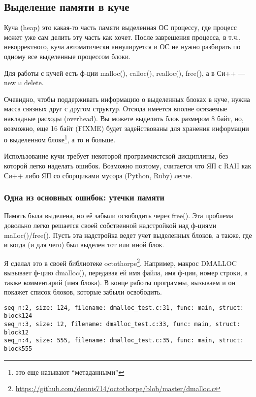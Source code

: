 ﻿\subsection{Выделение памяти в куче}

Куча (heap) это какая-то часть памяти выделенная ОС процессу, где процесс может уже сам делить эту часть как хочет.
После заврешения процесса, в т.ч., некорректного, куча автоматически аннулируется и ОС не нужно разбирать 
по одному все выделенные процессом блоки.

Для работы с кучей есть ф-ции malloc(), calloc(), realloc(), free(), а в Си++ --- new и delete.

Очевидно, чтобы поддерживать информацию о выделенных блоках в куче, нужна масса связных друг с другом структур.
Отсюда имеется вполне осязаемые накладные расходы (overhead). Вы можете выделить блок размером 8 байт, но, возможно, 
еще 16 байт (FIXME)
будет задействованы для хранения информации о выделенном блоке\footnote{это еще называют ``метаданными''}, 
а то и больше.

Использование кучи требует некоторой программистской дисциплины, без которой легко наделать ошибок.
Возможно поэтому, считается что ЯП с RAII как Си++
либо ЯП со сборщиками мусора (Python, Ruby) легче.

\subsubsection{Одна из основных ошибок: утечки памяти}

Память была выделена, но её забыли освободить через free(). Эта проблема довольно легко решается своей собственной
надстройкой над ф-циями malloc()/free(). Пусть эта надстройка ведет учет выделенных блоков, а также, где и когда
(и для чего) был выделен тот или иной блок.

Я сделал это в своей библиотеке octothorpe\footnote{\url{https://github.com/dennis714/octothorpe/blob/master/dmalloc.c}}. 
Например, макрос DMALLOC вызывает ф-цию dmalloc(), передавая
ей имя файла, имя ф-ции, номер строки, а также комментарий (имя блока). В конце работы программы, вызываем
 и он покажет список блоков, которые забыли освободить.

\begin{lstlisting}
seq_n:2, size: 124, filename: dmalloc_test.c:31, func: main, struct: block124
seq_n:3, size: 12, filename: dmalloc_test.c:33, func: main, struct: block12
seq_n:4, size: 555, filename: dmalloc_test.c:35, func: main, struct: block555
\end{lstlisting}

